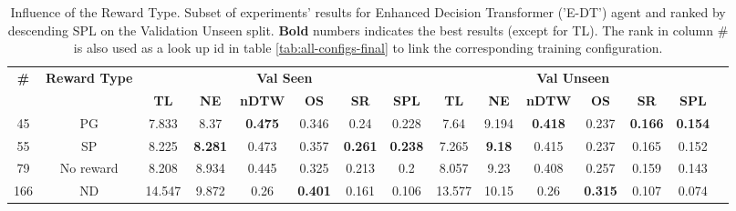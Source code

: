 \begin{table}
\centering
\caption{\label{tab:e_dt_reward_type}Influence of the Reward Type. Subset of experiments' results for Enhanced Decision Transformer ('E-DT') agent and ranked by descending SPL on the Validation Unseen split. \textbf{Bold} numbers indicates the best results (except for TL). The rank in column \# is also used as a look up id in table \ref{tab:all-configs-final} to link the corresponding training configuration.}
\begin{tabular}{@{\hskip3pt}c@{\hskip3pt}c@{\hskip3pt}c@{\hskip3pt}c@{\hskip3pt}c@{\hskip3pt}c@{\hskip3pt}c@{\hskip3pt}c@{\hskip3pt}c@{\hskip3pt}c@{\hskip3pt}c@{\hskip3pt}c@{\hskip3pt}c@{\hskip3pt}c@{\hskip3pt}c}
\toprule
                                  \textbf{\#} & \textbf{Reward Type} & \multicolumn{6}{c}{\textbf{Val Seen}} & \multicolumn{6}{c}{\textbf{Val Unseen}} \\
\cmidrule(l){3-8}\cmidrule(l){9-14}\textbf{~} &           \textbf{~} &       \textbf{TL} &     \textbf{NE} &   \textbf{nDTW} &     \textbf{OS} &     \textbf{SR} &    \textbf{SPL} &         \textbf{TL} &    \textbf{NE} &   \textbf{nDTW} &     \textbf{OS} &     \textbf{SR} &    \textbf{SPL} \\
\midrule
                                           45 &                   PG &             7.833 &            8.37 &  \textbf{0.475} &           0.346 &            0.24 &           0.228 &                7.64 &          9.194 &  \textbf{0.418} &           0.237 &  \textbf{0.166} &  \textbf{0.154} \\
                                           55 &                   SP &             8.225 &  \textbf{8.281} &           0.473 &           0.357 &  \textbf{0.261} &  \textbf{0.238} &               7.265 &  \textbf{9.18} &           0.415 &           0.237 &           0.165 &           0.152 \\
                                           79 &            No reward &             8.208 &           8.934 &           0.445 &           0.325 &           0.213 &             0.2 &               8.057 &           9.23 &           0.408 &           0.257 &           0.159 &           0.143 \\
                                          166 &                   ND &            14.547 &           9.872 &            0.26 &  \textbf{0.401} &           0.161 &           0.106 &              13.577 &          10.15 &            0.26 &  \textbf{0.315} &           0.107 &           0.074 \\
\bottomrule
\end{tabular}
\end{table}
